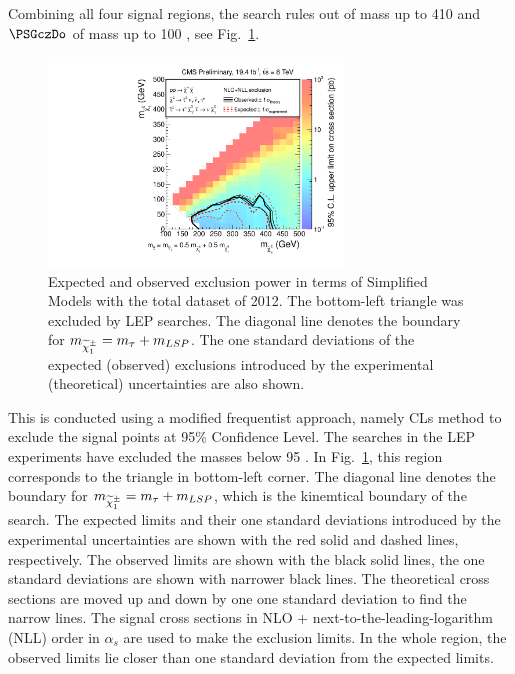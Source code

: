 Combining all four signal regions,
the search rules out \chione of mass up to 410 \GeV and  $\PSGczDo$ of mass up to 100 \GeV,
see Fig.~\ref{fig:limit_final}. 
\begin{linenomath}
\begin{figure}[h]
\centering
\includegraphics[width=0.7\textwidth,keepaspectratio=true]{StatisticsFig/Exclusion4Bins.pdf}
\caption{Expected and observed exclusion power in terms of Simplified Models
with the total dataset of 2012. The bottom-left triangle was excluded by LEP \sTau searches. 
The diagonal line denotes the boundary for $m_{\widetilde{\chi}^{\pm}_1} = m_{\tau} + m_{LSP}$.
The one standard deviations of the expected (observed) exclusions introduced by the experimental 
(theoretical) uncertainties are also shown.}
\label{fig:limit_final}
\end{figure}
\end{linenomath}
This is conducted using a modified frequentist approach, namely CLs method \cite{read:CLs} to 
exclude the signal points at 95\% Confidence Level.
The \sTau searches in the LEP experiments \cite{lepsusy} have excluded the masses below 95 \GeV. In Fig.~\ref{fig:limit_final}, 
this region corresponds to the triangle in bottom-left corner.%
The diagonal line denotes the boundary for $m_{\widetilde{\chi}^{\pm}_1} = m_{\tau} + m_{LSP}$, which is the kinemtical boundary of the search.
The expected limits and their one standard deviations introduced by the experimental 
uncertainties are shown with the red solid and dashed lines, respectively. The observed limits are shown with the black solid lines, the one 
standard deviations are shown with narrower black lines. The theoretical cross sections are moved up and down by one one standard deviation to 
find the narrow lines.
The signal cross sections in NLO + next-to-the-leading-logarithm (NLL) order in $\alpha_s$ are used to make the exclusion limits.
In the whole region, the observed limits lie closer than one standard deviation from the expected limits.  

